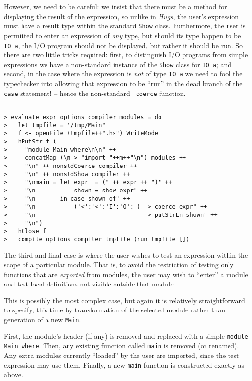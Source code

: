 \documentclass[a4paper]{article}
\begin{document}
However, we need to be careful: we insist that there must be a method
for displaying the result of the expression, so unlike in {\em Hugs},
the user's expression must have a result type within the standard
{\tt Show} class.  Furthermore, the user is permitted to enter an
expression of {\em any} type, but should its type happen to be {\tt
IO a}, the I/O program should not be displayed, but rather it should
be run.  So there are two little tricks required: first, to distinguish
I/O programs from simple expressions we have a non-standard instance
of the {\tt Show} class for {\tt IO a}; and second, in the case where
the expression is {\em not} of type {\tt IO a} we need to fool the
typechecker into allowing that expression to be ``run'' in the dead
branch of the {\tt case} statement! -- hence the non-standard {\tt
coerce} function.

\begin{verbatim}

> evaluate expr options compiler modules = do
>   let tmpfile = "/tmp/Main"
>   f <- openFile (tmpfile++".hs") WriteMode
>   hPutStr f (
>     "module Main where\n\n" ++
>     concatMap (\m-> "import "++m++"\n") modules ++
>     "\n" ++ nonstdCoerce compiler ++
>     "\n" ++ nonstdShow compiler ++
>     "\nmain = let expr  = (" ++ expr ++ ")" ++
>     "\n           shown = show expr" ++
>     "\n       in case shown of" ++
>     "\n           ('<':'<':'I':'O':_) -> coerce expr" ++
>     "\n           _                   -> putStrLn shown" ++
>     "\n")
>   hClose f
>   compile options compiler tmpfile (run tmpfile [])

\end{verbatim}

The third and final case is where the user wishes to test an expression
within the scope of a particular module.  That is, to avoid the
restriction of testing only functions that are {\em exported} from
modules, the user may wish to ``enter'' a module and test local
definitions not visible outside that module.

This is possibly the most complex case, but again it is relatively
straightforward to specify, this time by transformation of the selected
module rather than generation of a new {\tt Main}.

First, the module's header (if any) is removed and replaced with a
simple {\tt module Main where}.  Then, any existing function called
{\tt main} is removed (or renamed).  Any extra modules currently
``loaded'' by the user are imported, since the test expression may
use them.  Finally, a new {\tt main} function is constructed exactly
as above.
\end{document}
